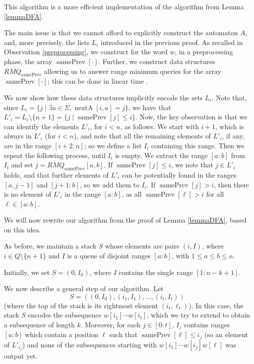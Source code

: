 \documentclass[10pt,a4paper]{amsart}
\makeatletter
\DeclareMathOperator{\prevArray}{samePrev}
\DeclareMathOperator{\nextpos}{nextA}
\theoremstyle{plain}
\theoremstyle{definition}
\renewenvironment{proof}[1][\proofname]{\par
  \pushQED{}%
  \normalfont \topsep6\p@\@plus6\p@\relax
  \trivlist
  \item[\hskip\labelsep\itshape #1\@addpunct{.}]\ignorespaces
}{%
  \popQED\endtrivlist\@endpefalse
}
\makeatother
\begin{document}
\begin{proof}
This algorithm is a more efficient implementation of the algorithm from Lemma \ref{lemmaDFA}. 

The main issue is that we cannot afford to explicitly construct the automaton $A$, and, more precisely, the lists $L_i$ introduced in the previous proof.
As recalled in Observation \ref{preprocessing}, we construct for the word $w$, in a preprocessing phase, the array $\prevArray[\cdot]$. 
Further, we construct data structures $RMQ_{\prevArray}$ allowing us to answer range minimum queries for the array $\prevArray[\cdot]$; this can be done in linear time \cite{BenderF02}. 

We now show how these data structures implicitly encode the sets $L_i$. Note that, since $L_i=\{j\mid \exists a\in \Sigma, \nextpos[i,a]=j\}$, we have that $L'_i=L_i\setminus \{n+1\}=\{j\mid \prevArray[j]\leq i\}$. Now, the key observation is that we can identify the elements $L'_i$, for $i<n$, as follows. We start with $i+1$, which is always in $L'_i$ (for $i<n$), and note that all the remaining elements of $L'_i$, if any, are in the range $[i+2:n]$; so we define a list $I_i$ containing this range. Then we repeat the following process, until $I_i$ is empty. We extract the range $[a:b]$ from $I_i$ and set $j=RMQ_{\prevArray}[a,b]$. If $\prevArray[j]\leq i$, we note that $j\in L'_i$ holds, and that further elements of $L'_i$ can be potentially found in the ranges $[a,j-1]$ and $[j+1:b]$, so we add them to $I_i$. If $\prevArray[j]> i$, then there is no element of $L'_i$ in the range $[a:b]$, as all $\prevArray[\ell]>i$ for all $\ell\in [a:b]$.

We will now rewrite our algorithm from the proof of Lemma \ref{lemmaDFA}, based on this idea.

As before, we maintain a stack $S$ whose elements are pairs $(i,I)$, where $i\in Q\setminus \{n+1\}$ and $I$ is a queue of disjoint ranges $[a:b]$, with $1\leq a\leq b\leq n$. 

Initially, we set $S=(0,I_0)$, where $I$ contains the single range $[1:n-k+1]$. 

We now describe a general step of our algorithm. Let 
\[
S=((0,I_0), (i_1, I_1), \ldots, (i_t, I_t))
\]
(where the top of the stack is its rightmost element $(i_t, \ell_t)$). In this case, the stack $S$ encodes the subsequence $w[i_1]\cdots w[i_t]$, which we try to extend to obtain a subsequence of length $k$. Moreover, for each $j\in [0:t]$, $I_j$ contains ranges $[a:b]$ which contain a position $\ell$ such that $\prevArray[\ell]\leq i_j$ (so an element of $L'_{i_j}$) and none of the subsequences starting with $w[i_1]\cdots w[i_j]w[\ell]$ was output yet. 


\end{proof}
\end{document}
